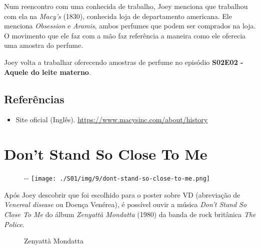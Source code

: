 Num reencontro com uma conhecida de trabalho, Joey menciona que
trabalhou com ela na \emph{Macy's} (1830), conhecida loja de
departamento americana. Ele menciona \emph{Obsession} e \emph{Aramis},
ambos perfumes que podem ser comprados na loja. O movimento que ele faz
com a mão faz referência a maneira como ele oferecia uma amostra do
perfume.

Joey volta a trabalhar oferecendo amostras de perfume no episódio
\textbf{\textcolor{primarycolor}{S02E02 - Aquele do leite materno}}.

\hypertarget{referuxeancias-1}{%
\subsection{Referências}\label{referuxeancias-1}}

\begin{itemize}
\tightlist
\item
  \sloppy Site oficial (Inglês). \url{https://www.macysinc.com/about/history}
\end{itemize}

\hypertarget{dont-stand-so-close-to-me}{%
\section{Don't Stand So Close To Me}\label{dont-stand-so-close-to-me}}

\begin{figure}[!ht]
  \begin{adjustwidth}{-\oddsidemargin-1in}{-\rightmargin}
    \centering
    \texttt{[image: ./S01/img/9/dont-stand-so-close-to-me.png]}
  \end{adjustwidth}
\end{figure}

Após Joey descobrir que foi escolhido para o poster sobre VD (abreviação
de \emph{Venereal disease} ou Doença Venérea), é possível ouvir a música
\emph{Don't Stand So Close To Me} do álbum \emph{Zenyattà Mondatta}
(1980) da banda de rock britânica \emph{The Police}.

\begin{figure}
  \centering
    \caption{Zenyattà Mondatta\label{fig:zenyatt-mondatta}}
\end{figure}

